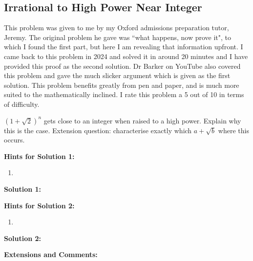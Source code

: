 \subsection{Irrational to High Power Near Integer}

This problem was given to me by my Oxford admissions preparation tutor, Jeremy. The original problem he gave was ``what happens, now prove it", to which I found the first part, but here I am revealing that information upfront. I came back to this problem in 2024 and solved it in around 20 minutes and I have provided this proof as the second solution. Dr Barker on YouTube also covered this problem and gave the much slicker argument which is given as the first solution. This problem benefits greatly from pen and paper, and is much more suited to the mathematically inclined. I rate this problem a 5 out of 10 in terms of difficulty.

$(1 + \sqrt{2})^n$ gets close to an integer when raised to a high power. Explain why this is the case. Extension question: characterise exactly which $a + \sqrt{b}$ where this occurs.

\textbf{Hints for Solution 1:}

\begin{enumerate}
    \item 
\end{enumerate}

\textbf{Solution 1:}



\textbf{Hints for Solution 2:}

\begin{enumerate}
    \item 
\end{enumerate}

\textbf{Solution 2:}



\textbf{Extensions and Comments:}